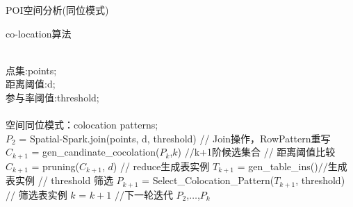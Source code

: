 \begin{frame}[t]{POI空间分析(同位模式)}

\begin{algorithm}[H]
\tiny
\caption{co-location算法}
\begin{algorithmic}[1]   
\REQUIRE  ~~\\  
点集:points;\\  
距离阈值:d;\\
参与率阈值:threshold;\\  
\ENSURE ~~\\  
空间同位模式：colocation patterns; \\
\pause
\STATE $P_2$ = Spatial-Spark.join(points, d, threshold)
\pause
\STATE // \alert{Join操作，RowPattern重写}
\STATE $C_{k+1}$ = gen\_candinate\_cocolation($P_k$,$k$) $//$k+1阶候选集合
\pause
\STATE // \alert{距离阈值比较}
\STATE $C_{k+1}$ = pruning($C_{k+1}$, $d$)
\pause
\STATE // \alert{reduce生成表实例}
\STATE $T_{k+1}$ = gen\_table\_ins()$//$生成表实例
\pause
\STATE // \alert{threshold 筛选}
\STATE $P_{k+1}$ = Select\_Colocation\_Pattern($T_{k+1}$, threshold) $//$ 筛选表实例
\pause
\STATE $k$ = $k+1$ $//$下一轮迭代
\pause
\ENDWHILE 
\pause
\RETURN $P_2$,$\dots$,$P_k$
\end{algorithmic}
\end{algorithm} 
\end{frame}


